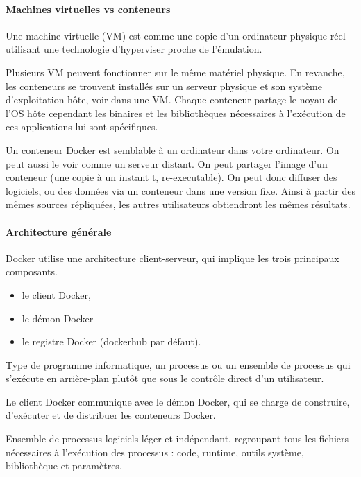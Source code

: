 \documentclass[french, 12pt]{article}%
\newcommand{\itemE}{\item[$\bullet$]}
\newcommand{\titreencadre}{Titre}
\newenvironment{encadre}[1]{\renewcommand{\titreencadre}{#1}
	\begin{mdframed}[style=encadrestyle]
	\vspace{0.5\baselineskip}
	}{%
	\end{mdframed}}
\begin{document}
\paragraph{Machines virtuelles vs conteneurs} Une machine virtuelle (VM) est comme une copie d'un ordinateur physique réel utilisant une technologie d’hyperviser proche de l’émulation. 

Plusieurs VM peuvent fonctionner sur le même matériel physique. En revanche, les conteneurs se trouvent installés sur un serveur physique et son système d'exploitation hôte, voir dans une VM.
Chaque conteneur partage le noyau de l'OS hôte cependant les binaires et les bibliothèques nécessaires à l'exécution de ces applications lui sont spécifiques.
  
Un conteneur Docker est semblable à un ordinateur dans votre ordinateur. On peut aussi le voir comme un serveur distant.  On peut partager l’image d’un conteneur (une copie à un instant t, re-executable).  On peut donc diffuser des logiciels, ou des données via un conteneur dans une version fixe.  Ainsi à partir des mêmes sources répliquées, les autres utilisateurs obtiendront les mêmes résultats. 


\paragraph{Architecture générale} Docker utilise une architecture client-serveur, qui implique les trois principaux composants.   
\begin{itemize}
\itemE le client Docker, 
\itemE le démon Docker 
\itemE le registre Docker (dockerhub par défaut).
\end{itemize}
  
\begin{encadre}{Daemon}
Type de programme informatique, un processus ou un ensemble de processus qui s'exécute en arrière-plan plutôt que sous le contrôle direct d'un utilisateur.
\end{encadre}  
  
Le client Docker communique avec le démon Docker, qui se charge de construire, d'exécuter et de distribuer les conteneurs Docker. 


\begin{encadre}{Container}
Ensemble de processus logiciels léger et indépendant, regroupant tous les fichiers nécessaires à l’exécution des processus : code, runtime, outils système, bibliothèque et paramètres.
\end{encadre}
\end{document}
